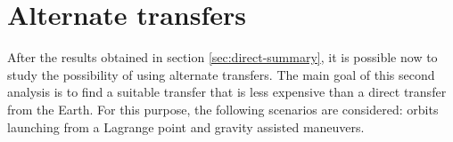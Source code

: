 \chapter{Alternate transfers}

After the results obtained in section \ref{sec:direct-summary}, it is possible
now to study the possibility of using alternate transfers. The main goal of this
second analysis is to find a suitable transfer that is less expensive than a
direct transfer from the Earth. For this purpose, the following scenarios are
considered: orbits launching from a Lagrange point and gravity assisted
maneuvers.




